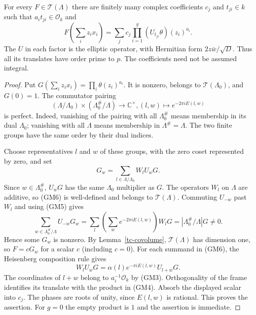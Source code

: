 \begin{proposition}\label{gm-finite-expansion}
For every $F\in\mathcal T(\Lambda)$ there are finitely many
complex coefficients $c_j$ and $t_{ji}\in k$ such that
$a_it_{ji}\in\mathcal O_k$ and
\[
 F\left(\sum_i z_ix_i\right)
       =\sum_j c_j\prod_{i=1}^g(U_{t_{ji}}\theta)(z_i)^{a_i}.
                                                               \tag{GM4}
\]
The $U$ in each factor is the elliptic operator, with Hermitian
form $2z\bar w/\sqrt D$.  Thus all its translates have order
prime to $p$.  The coefficients need not be assumed integral.
\end{proposition}
\begin{proof}
Put $G(\sum_i z_ix_i)=\prod_i\theta(z_i)^{a_i}$.
It is nonzero, belongs to $\mathcal T(\Lambda_0)$, and
$G(0)=1$.  The commutator pairing
\[
 (\Lambda/\Lambda_0)\times(\Lambda_0^\#/\Lambda)
       \longrightarrow\mathbb C^\times,
             (l,w)\longmapsto e^{-2\pi iE(l,w)}              \tag{GM5}
\]
is perfect.  Indeed, vanishing of the pairing with all
$\Lambda_0^\#$ means membership in its dual $\Lambda_0$;
vanishing with all $\Lambda$ means membership in
$\Lambda^\#=\Lambda$.  The two finite groups have the
same order by their dual indices.

Choose representatives $l$ and $w$ of these groups, with
the zero coset represented by zero, and set
\[
                      G_w=\sum_{l\in\Lambda/\Lambda_0}W_lU_wG.
                                                               \tag{GM6}
\]
Since $w\in\Lambda_0^\#$, $U_wG$ has the same
$\Lambda_0$ multiplier as $G$.  The operators $W_l$ on
$\Lambda$ are additive, so (GM6) is well-defined and belongs
to $\mathcal T(\Lambda)$.  Commuting $U_{-w}$ past $W_l$
and using (GM5) gives
\[
 \sum_{w\in\Lambda_0^\#/\Lambda}U_{-w}G_w
    =\sum_l\left(\sum_w e^{-2\pi iE(l,w)}\right)W_lG
    =|\Lambda_0^\#/\Lambda|G\ne0.                            \tag{GM7}
\]
Hence some $G_w$ is nonzero.  By
Lemma~\ref{tc-covolume}, $\mathcal T(\Lambda)$ has dimension
one, so $F=cG_w$ for a scalar $c$ (including $c=0$).
For each summand in (GM6), the Heisenberg composition rule gives
\[
 W_lU_wG=\alpha(l)e^{-\pi iE(l,w)}U_{l+w}G.
\]
The coordinates of $l+w$ belong to $a_i^{-1}\mathcal O_k$
by (GM3).  Orthogonality of the frame identifies its translate
with the product in (GM4).  Absorb the displayed scalar into
$c_j$.  The phases are roots of unity, since $E(l,w)$ is
rational.  This proves the assertion.
For $g=0$ the empty product is $1$ and the assertion is immediate.
\end{proof}

